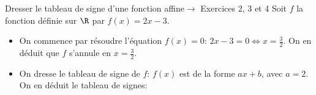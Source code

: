 \documentclass[a4paper]{article}
\begin{document}
 \begin{methode*}[sidebyside, righthand width=2.2cm,segmentation code={}]{Dresser le tableau de signe d'une fonction affine$\longrightarrow$ Exercices 2, 3 et 4}{}
  Soit $f$ la fonction définie sur $\R$ par $f(x)=2x-3$.
  \begin{itemize}
    \item On commence par résoudre l'équation $f(x)=0$: $2x-3=0 \iff x=\frac{3}{2}$. On en déduit que $f$ s'annule en $x=\frac{3}{2}$.
    \item On dresse le tableau de signe de $f$: $f(x)$ est de la forme $ax+b$, avec $a=2$. On en déduit le tableau de signes:
    \begin{center}
    \end{center}
    \end{itemize}
   \tcblower
  \end{methode*}
\end{document}

